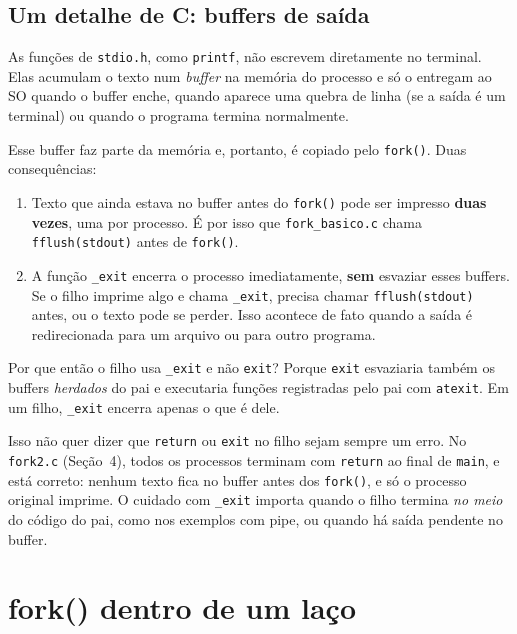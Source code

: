 \documentclass[11pt,a4paper]{article}
\newcommand{\cmd}[1]{\texttt{#1}}
\begin{document}
\subsection{Um detalhe de C: buffers de saída}

As funções de \cmd{stdio.h}, como \cmd{printf}, não escrevem diretamente no terminal. Elas acumulam o texto num \emph{buffer} na memória do processo e só o entregam ao SO quando o buffer enche, quando aparece uma quebra de linha (se a saída é um terminal) ou quando o programa termina normalmente.

Esse buffer faz parte da memória e, portanto, é copiado pelo \cmd{fork()}. Duas consequências:

\begin{enumerate}
    \item Texto que ainda estava no buffer antes do \cmd{fork()} pode ser impresso \textbf{duas vezes}, uma por processo. É por isso que \cmd{fork\_basico.c} chama \cmd{fflush(stdout)} antes de \cmd{fork()}.
    \item A função \cmd{\_exit} encerra o processo imediatamente, \textbf{sem} esvaziar esses buffers. Se o filho imprime algo e chama \cmd{\_exit}, precisa chamar \cmd{fflush(stdout)} antes, ou o texto pode se perder. Isso acontece de fato quando a saída é redirecionada para um arquivo ou para outro programa.
\end{enumerate}

Por que então o filho usa \cmd{\_exit} e não \cmd{exit}? Porque \cmd{exit} esvaziaria também os buffers \emph{herdados} do pai e executaria funções registradas pelo pai com \cmd{atexit}. Em um filho, \cmd{\_exit} encerra apenas o que é dele.

Isso não quer dizer que \cmd{return} ou \cmd{exit} no filho sejam sempre um erro. No \cmd{fork2.c} (Seção~4), todos os processos terminam com \cmd{return} ao final de \cmd{main}, e está correto: nenhum texto fica no buffer antes dos \cmd{fork()}, e só o processo original imprime. O cuidado com \cmd{\_exit} importa quando o filho termina \emph{no meio} do código do pai, como nos exemplos com pipe, ou quando há saída pendente no buffer.

\section{fork() dentro de um laço}
\end{document}
